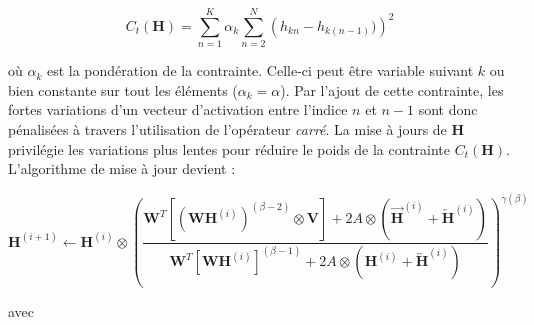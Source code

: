 \begin{equation}\label{eq:smoothnessVirtanen}
C_t(\mathbf{H}) = \sum_{n=1}^K \alpha_k\sum_{n=2}^N \left(h_{kn} - h_{k(n-1)})\right)^2
\end{equation}

où $\alpha_k$ est la pondération de la contrainte. Celle-ci peut être variable suivant $k$ ou bien constante sur tout les éléments ($\alpha_k = \alpha$). Par l'ajout de cette contrainte, les fortes variations d'un vecteur d'activation entre l'indice $n$ et $n-1$ sont donc pénalisées à travers l'utilisation de l'opérateur \textit{carré}. La mise à jours de $\mathbf{H}$ privilégie les variations plus lentes pour réduire le poids de la contrainte $C_t(\mathbf{H})$. L'algorithme de mise à jour devient :

\begin{equation}
\textbf{H}^{(i+1)} \leftarrow \textbf{H}^{(i)} \otimes\left(\frac{\textbf{W}^T \left[\left(\textbf{WH}^{(i)} \right)^{(\beta-2)} \otimes \textbf{V} \right] + 2 A \otimes \left(\overrightarrow{\mathbf{H}}^{(i)} + \overleftarrow{\mathbf{H}}^{(i)} \right)}{\textbf{W}^T \left[\textbf{WH}^{(i)} \right]^{(\beta-1)} + 2 A \otimes \left(\mathbf{H}^{(i)} + \overleftrightarrow{\mathbf{H}}^{(i)} \right)}\right)^{\gamma(\beta)}\label{eq:HupdateSmooth}
\end{equation}

avec

